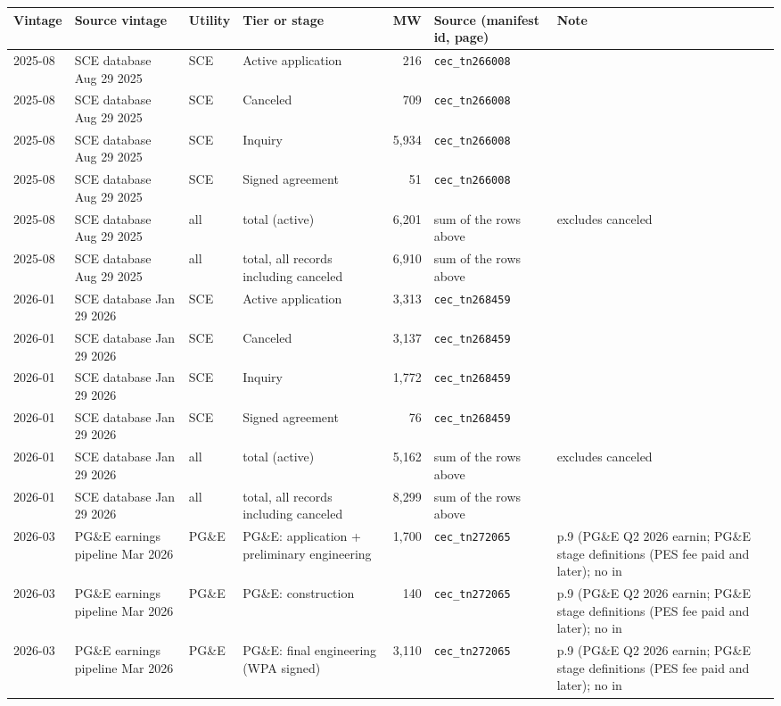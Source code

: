 \begin{tabular}{lp{3.2cm}lp{3.4cm}rp{4.2cm}p{5cm}}
\toprule
Vintage & Source vintage & Utility & Tier or stage & MW & Source (manifest id, page) & Note \\
\midrule
2025-08 & SCE database Aug 29 2025 & SCE & Active application & 216 & \texttt{cec\_\allowbreak{}tn266008} &  \\
2025-08 & SCE database Aug 29 2025 & SCE & Canceled & 709 & \texttt{cec\_\allowbreak{}tn266008} &  \\
2025-08 & SCE database Aug 29 2025 & SCE & Inquiry & 5,934 & \texttt{cec\_\allowbreak{}tn266008} &  \\
2025-08 & SCE database Aug 29 2025 & SCE & Signed agreement & 51 & \texttt{cec\_\allowbreak{}tn266008} &  \\
2025-08 & SCE database Aug 29 2025 & all & total (active) & 6,201 & sum of the rows above & excludes canceled \\
2025-08 & SCE database Aug 29 2025 & all & total, all records including canceled & 6,910 & sum of the rows above & \\
\midrule
2026-01 & SCE database Jan 29 2026 & SCE & Active application & 3,313 & \texttt{cec\_\allowbreak{}tn268459} &  \\
2026-01 & SCE database Jan 29 2026 & SCE & Canceled & 3,137 & \texttt{cec\_\allowbreak{}tn268459} &  \\
2026-01 & SCE database Jan 29 2026 & SCE & Inquiry & 1,772 & \texttt{cec\_\allowbreak{}tn268459} &  \\
2026-01 & SCE database Jan 29 2026 & SCE & Signed agreement & 76 & \texttt{cec\_\allowbreak{}tn268459} &  \\
2026-01 & SCE database Jan 29 2026 & all & total (active) & 5,162 & sum of the rows above & excludes canceled \\
2026-01 & SCE database Jan 29 2026 & all & total, all records including canceled & 8,299 & sum of the rows above & \\
\midrule
2026-03 & PG\&E earnings pipeline Mar 2026 & PG\&E & PG\&E: application + preliminary engineering & 1,700 & \texttt{cec\_\allowbreak{}tn272065} & p.9 (PG\&E Q2 2026 earnin; PG\&E stage definitions (PES fee paid and later); no in \\
2026-03 & PG\&E earnings pipeline Mar 2026 & PG\&E & PG\&E: construction & 140 & \texttt{cec\_\allowbreak{}tn272065} & p.9 (PG\&E Q2 2026 earnin; PG\&E stage definitions (PES fee paid and later); no in \\
2026-03 & PG\&E earnings pipeline Mar 2026 & PG\&E & PG\&E: final engineering (WPA signed) & 3,110 & \texttt{cec\_\allowbreak{}tn272065} & p.9 (PG\&E Q2 2026 earnin; PG\&E stage definitions (PES fee paid and later); no in \\

\end{tabular}
